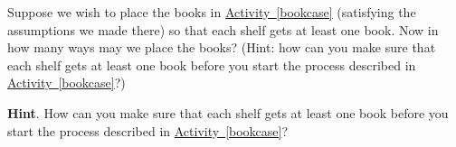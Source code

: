 \documentclass{book}
\begin{document}
\setcounter{cpjt}{126}
\addtocounter{cpjt}{-1}
\begin{activity}\label{bookcaseeveryshelf}
\hypertarget{p-855}{}%
Suppose we wish to place the books in \hyperref[bookcase]{Activity~\ref{bookcase}} (satisfying the assumptions we made there) so that each shelf gets at least one book. Now in how many ways may we place the books? (Hint: how can you make sure that each shelf gets at least one book before you start the process described in \hyperref[bookcase]{Activity~\ref{bookcase}}?)%
\par\smallskip%
\noindent\textbf{Hint}.\hypertarget{hint-84}{}\quad%
\hypertarget{p-856}{}%
How can you make sure that each shelf gets at least one book before you start the process described in \hyperref[bookcase]{Activity~\ref{bookcase}}?%
\par\smallskip%
\noindent\end{activity}

\clearpage
\end{document}
